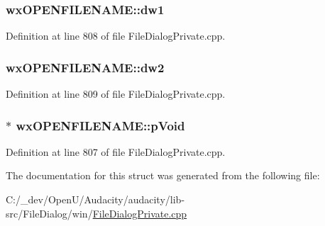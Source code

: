 \subsubsection[{\texorpdfstring{dw1}{dw1}}]{ wx\+O\+P\+E\+N\+F\+I\+L\+E\+N\+A\+M\+E\+::dw1}\hypertarget{structwx_o_p_e_n_f_i_l_e_n_a_m_e_ae73d3930e2953ad6504b6e609d470c87}{}\label{structwx_o_p_e_n_f_i_l_e_n_a_m_e_ae73d3930e2953ad6504b6e609d470c87}


Definition at line 808 of file File\+Dialog\+Private.\+cpp.

\subsubsection[{\texorpdfstring{dw2}{dw2}}]{ wx\+O\+P\+E\+N\+F\+I\+L\+E\+N\+A\+M\+E\+::dw2}\hypertarget{structwx_o_p_e_n_f_i_l_e_n_a_m_e_a125d2c8b694346af7785abfe81bcd8dc}{}\label{structwx_o_p_e_n_f_i_l_e_n_a_m_e_a125d2c8b694346af7785abfe81bcd8dc}


Definition at line 809 of file File\+Dialog\+Private.\+cpp.

\subsubsection[{\texorpdfstring{p\+Void}{pVoid}}]{$\ast$ wx\+O\+P\+E\+N\+F\+I\+L\+E\+N\+A\+M\+E\+::p\+Void}\hypertarget{structwx_o_p_e_n_f_i_l_e_n_a_m_e_acf2df046a62d8860ab994c9d7e6a204b}{}\label{structwx_o_p_e_n_f_i_l_e_n_a_m_e_acf2df046a62d8860ab994c9d7e6a204b}


Definition at line 807 of file File\+Dialog\+Private.\+cpp.



The documentation for this struct was generated from the following file\+:\begin{DoxyCompactItemize}
\item 
C\+:/\+\_\+dev/\+Open\+U/\+Audacity/audacity/lib-\/src/\+File\+Dialog/win/\hyperlink{win_2_file_dialog_private_8cpp}{File\+Dialog\+Private.\+cpp}\end{DoxyCompactItemize}
